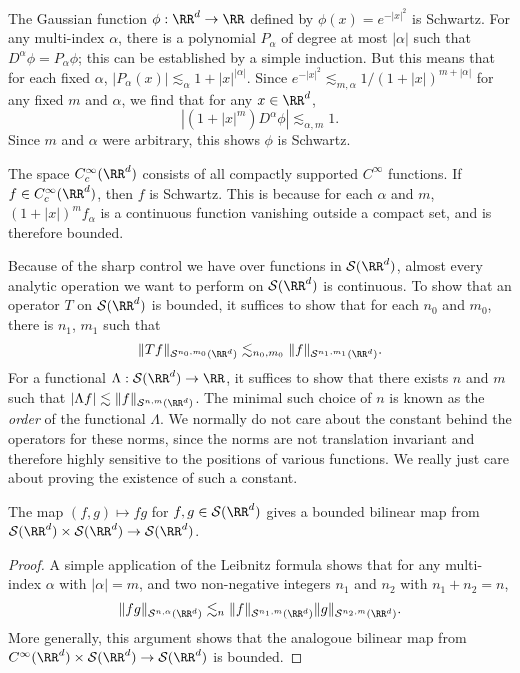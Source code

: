 \begin{example}
    The Gaussian function $\phi: \RR^d \to \RR$ defined by $\phi(x) = e^{-|x|^2}$ is Schwartz. For any multi-index $\alpha$, there is a polynomial $P_\alpha$ of degree at most $|\alpha|$ such that $D^\alpha \phi = P_\alpha \phi$; this can be established by a simple induction. But this means that for each fixed $\alpha$, $|P_\alpha(x)| \lesssim_\alpha 1 + |x|^{|\alpha|}$. Since $e^{-|x|^2} \lesssim_{m,\alpha} 1/(1 + |x|)^{m + |\alpha|}$ for any fixed $m$ and $\alpha$, we find that for any $x \in \RR^d$,
    \[ | (1 + |x|^m) D^\alpha \phi| \lesssim_{\alpha,m} 1. \]
    Since $m$ and $\alpha$ were arbitrary, this shows $\phi$ is Schwartz.
\end{example}

\begin{example}
    The space $C^\infty_c(\RR^d)$ consists of all compactly supported $C^\infty$ functions. If $f \in C^\infty_c(\RR^d)$, then $f$ is Schwartz. This is because for each $\alpha$ and $m$, $(1 + |x|)^m f_\alpha$ is a continuous function vanishing outside a compact set, and is therefore bounded.
\end{example} 

Because of the sharp control we have over functions in $\mathcal{S}(\RR^d)$, almost every analytic operation we want to perform on $\mathcal{S}(\RR^d)$ is continuous. To show that an operator $T$ on $\mathcal{S}(\RR^d)$ is bounded, it suffices to show that for each $n_0$ and $m_0$, there is $n_1$, $m_1$ such that
%
\[ \| Tf \|_{\mathcal{S}^{n_0,m_0}(\RR^d)} \lesssim_{n_0,m_0} \| f \|_{\mathcal{S}^{n_1,m_1}(\RR^d)}. \]
%
For a functional $\Lambda: \mathcal{S}(\RR^d) \to \RR$, it suffices to show that there exists $n$ and $m$ such that $|\Lambda f| \lesssim \| f \|_{\mathcal{S}^{n,m}(\RR^d)}$. The minimal such choice of $n$ is known as the \emph{order} of the functional $\Lambda$. We normally do not care about the constant behind the operators for these norms, since the norms are not translation invariant and therefore highly sensitive to the positions of various functions. We really just care about proving the existence of such a constant.

\begin{lemma}
  The map $(f,g) \mapsto fg$ for $f,g \in \mathcal{S}(\RR^d)$ gives a bounded bilinear map from $\mathcal{S}(\RR^d) \times \mathcal{S}(\RR^d) \to \mathcal{S}(\RR^d)$.
\end{lemma}
\begin{proof}
  A simple application of the Leibnitz formula shows that for any multi-index $\alpha$ with $|\alpha| = m$, and two non-negative integers $n_1$ and $n_2$ with $n_1 + n_2 = n$,
  \[ \| fg \|_{\mathcal{S}^{n,\alpha}(\RR^d)} \lesssim_n \| f \|_{\mathcal{S}^{n_1,m}(\RR^d)} \| g \|_{\mathcal{S}^{n_2,m}(\RR^d)}. \]
  More generally, this argument shows that the analogoue bilinear map from $C^\infty(\RR^d) \times \mathcal{S}(\RR^d) \to \mathcal{S}(\RR^d)$ is bounded.
\end{proof}

